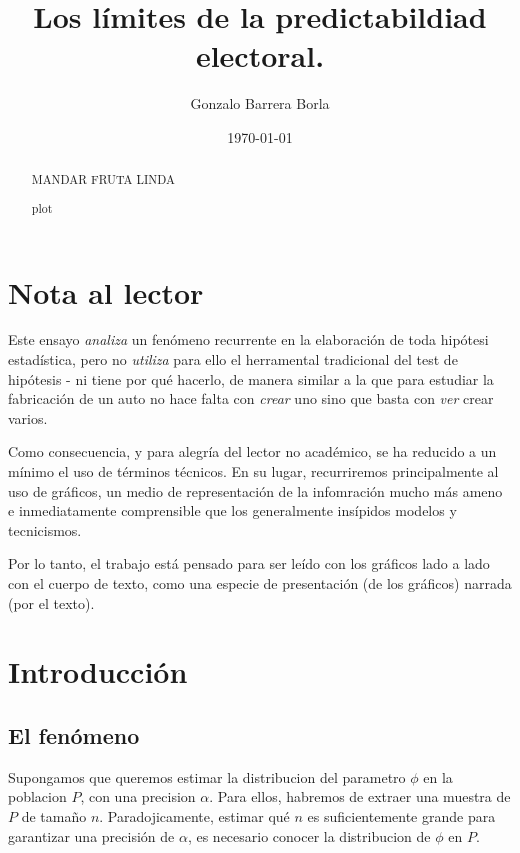 \documentclass[12pt, a4paper]{article}
\begin{document}
\title{Los l\'imites de la predictabildiad electoral.}
\author{Gonzalo Barrera Borla}
\date{\today}

\maketitle

\pagebreak

\begin{abstract}
MANDAR FRUTA LINDA 

plot 
\end{abstract}

\pagebreak

\tableofcontents

\pagebreak

\section{Nota al lector}

Este ensayo \emph{analiza} un fen\'omeno recurrente en la elaboraci\'on de toda hip\'otesi estad\'istica, pero no \emph{utiliza} para ello el herramental tradicional del test de hip\'otesis - ni tiene por qu\'e hacerlo, de manera similar a la que para estudiar la fabricaci\'on de un auto no hace falta con \emph{crear} uno sino que basta con \emph{ver} crear varios.

Como consecuencia, y para alegr\'ia del lector no acad\'emico, se ha reducido a un m\'inimo el uso de t\'erminos t\'ecnicos. En su lugar, recurriremos principalmente al uso de gr\'aficos, un medio de representaci\'on de la infomraci\'on mucho m\'as ameno e inmediatamente comprensible que los generalmente ins\'ipidos modelos y tecnicismos.

Por lo tanto, el trabajo est\'a pensado para ser le\'ido con los gr\'aficos lado a lado con el cuerpo de texto, como una especie de presentaci\'on (de los gr\'aficos) narrada (por el texto).  

\pagebreak

\section{Introducci\'on}

\subsection{El fen\'omeno}

Supongamos que queremos estimar la distribucion del parametro $\phi$ en la poblacion $P$, con una precision $\alpha$. Para ellos, habremos de extraer una muestra de $P$ de tama\~no $n$. Paradojicamente, estimar qu\'e $n$ es suficientemente grande para garantizar una precisi\'on de $\alpha$, es necesario conocer la distribucion de $\phi$ en $P$.
\end{document}
